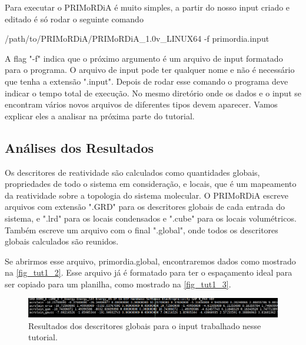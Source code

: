 \documentclass[a4paper,11pt]{refart}
\begin{document}
Para executar o PRIMoRDiA é muito simples, a partir do nosso input criado e editado é só rodar o seguinte comando

\hspace*{-\leftmarginwidth}
\begin{minipage}{\fullwidth}
\begin{commandshell}/path/to/PRIMoRDiA/PRIMoRDiA_1.0v_LINUX64 -f primordia.input\end{commandshell}
\end{minipage}

A flag "-f" indica que o próximo argumento é um arquivo de input formatado para o programa. O arquivo de input pode ter qualquer nome e não é necessário que tenha a extensão ".input". Depois de rodar esse comando o programa deve indicar o tempo total de execução. No mesmo diretório onde os dados e o input se encontram vários novos arquivos de diferentes tipos devem aparecer. Vamos explicar eles a analisar na próxima parte do tutorial.


\subsection{Análises dos Resultados}

Os descritores de reatividade são calculados como quantidades globais, propriedades de todo o sistema em consideração, e locais, que é um mapeamento da reatividade sobre a topologia do sistema molecular. O PRIMoRDiA escreve arquivos com extensão ".GRD" para os descritores globais de cada entrada do sistema, e ".lrd" para os locais condensados e ".cube" para os locais volumétricos. Também escreve um arquivo com o final ".global", onde todos os descritores globais calculados são reunidos.

Se abrirmos esse arquivo, primordia.global, encontraremos dados como mostrado na \autoref{fig_tut1_2}. Esse arquivo já é formatado para ter o espaçamento ideal para ser copiado para um planilha, como mostrado na \autoref{fig_tut1_3}.


\hspace*{-1.2\leftmarginwidth}
\begin{minipage}{\fullwidth}
	\begin{figure}[H]
		\begin{center}
			\includegraphics[width=7in]{images/img3}
			\caption{Resultados dos descritores globais para o input trabalhado nesse tutorial.}
			\label{fig_tut1_2}
		\end{center}
	\end{figure}
\end{minipage}	
\end{document}
